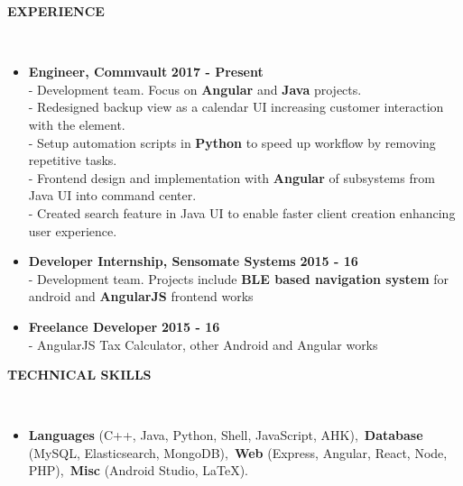 \documentclass[a4paper,10pt]{article}
\newcommand{\lsep}{-0.5cm}
\newcommand{\resheading}[1]{{\small \colorbox{mygrey}{\begin{minipage}{0.975\textwidth}{\textbf{\uppercase{#1} \vphantom{p\^{E}}}}\end{minipage}}}}
\newcommand{\when}[1]{\hfill \textbf{#1}}
\newenvironment{noSepItemize}
{ \begin{itemize}
    \setlength{\itemsep}{1pt}
    \setlength{\parskip}{0pt}
    \setlength{\parsep}{0pt}     }
{ \end{itemize}                  }
\begin{document}
\resheading{\textbf{Experience} }\\[\lsep]
\begin{noSepItemize}
\item \noindent \textbf{Engineer, Commvault} \when{2017 - Present}\\
	\indent - Development team. Focus on \textbf{Angular} and \textbf{Java} projects.\\
	\indent - Redesigned backup view as a calendar UI increasing customer interaction with the element.\\
	\indent - Setup automation scripts in \textbf{Python} to speed up workflow by removing repetitive tasks.\\
	\indent - Frontend design and implementation with \textbf{Angular} of subsystems from Java UI into command center.\\
	\indent - Created search feature in Java UI to enable faster client creation enhancing user experience.
\item \noindent \textbf{Developer Internship, Sensomate Systems} \when{2015 - 16}\\
	\indent - Development team. Projects include \textbf{BLE based navigation system} for android and \textbf{AngularJS} frontend works
\item \noindent \textbf{Freelance Developer} \when{2015 - 16}\\
	\indent - AngularJS Tax Calculator, other Android and Angular works
\end{noSepItemize}

\resheading{\textbf{TECHNICAL SKILLS} }\\[\lsep]
\begin{noSepItemize}
\item \noindent \textbf{Languages} (C++, Java, Python, Shell, JavaScript, AHK),\, \textbf{Database} (MySQL, Elasticsearch, MongoDB),\, \textbf{Web} (Express, Angular, React, Node, PHP),\, \textbf{Misc} (Android Studio, \LaTeX).
\end{noSepItemize}
\end{document}
